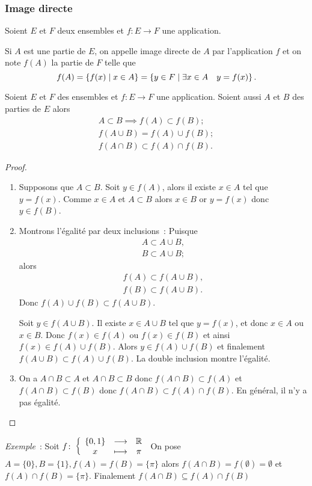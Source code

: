 \subsubsection{Image directe}
\label{chap3-subsec:imagedirecte}
Soient $E$ et $F$ deux ensembles et $f: E \longrightarrow F$ une application.
\begin{defdef}
  Si $A$ est une partie de $E$, on appelle image directe de $A$ par l'application $f$ et on note $f(A)$ la partie de $F$ telle que
  \begin{equation}
    f(A)=\left\{f(x)\mathrel{}\middle|\mathrel{}x \in A\right\}=\left\{y \in F\mathrel{}\middle|\mathrel{}\exists x \in A \quad y=f(x)\right\}.
  \end{equation}
\end{defdef}
%
\begin{prop}
  Soient $E$ et $F$ des ensembles et $f:E \longrightarrow F$ une application. Soient aussi $A$ et $B$ des parties de $E$ alors
  \begin{gather}
    A \subset B \implies f(A) \subset f(B); \\
    f(A \cup B)=f(A) \cup f(B); \\
    f(A \cap B) \subset f(A) \cap f(B).
  \end{gather}
\end{prop}
\begin{proof}
  \begin{enumerate}
  \item Supposons que $A \subset B$. Soit $y \in f(A)$, alors il existe $x \in A$ tel que $y=f(x)$. Comme $x \in A$ et $A \subset B$ alors $x \in B$ or $y=f(x)$ donc $y \in f(B)$.
  \item Montrons l'égalité par deux inclusions~: Puisque
      \begin{gather}
        A \subset A \cup B, \\
        B \subset A \cup B;
      \end{gather}
      alors
      \begin{gather}
        f(A) \subset f(A \cup B), \\
        f(B) \subset f(A \cup B).
      \end{gather}
      Donc $f(A) \cup f(B) \subset f(A \cup B)$.
      
      Soit $y \in f(A \cup B)$. Il existe $x \in A \cup B$ tel que $y=f(x)$, et donc $x \in A$ ou $x \in B$. Donc $f(x) \in f(A)$ ou $f(x) \in f(B)$ et ainsi $f(x) \in f(A) \cup  f(B)$. Alors $y \in f(A) \cup f(B)$ et finalement $f(A \cup B) \subset f(A) \cup f(B)$. La double inclusion montre l'égalité.
  \item On a $A \cap B \subset A$ et $A \cap B \subset B$ donc $f(A \cap B) \subset f(A)$ et $f(A \cap B) \subset f(B)$ donc $f(A \cap B) \subset f(A) \cap f(B)$. En général, il n'y a pas égalité.
  \end{enumerate}
\end{proof}
%
\emph{Exemple}~: Soit $f\colon \left\{\begin{array}{ccc} \{0,1\} & \longrightarrow &\mathbb{R}\\ x & \longmapsto & \pi \end{array} \right.$ On pose $A=\{0\}, B=\{1\}, f(A)=f(B)=\{\pi\}$ alors $f(A \cap B)=f(\emptyset)=\emptyset$ et $f(A) \cap f(B)=\{\pi\}$. Finalement $f(A \cap B) \subseteq f(A) \cap f(B)$

